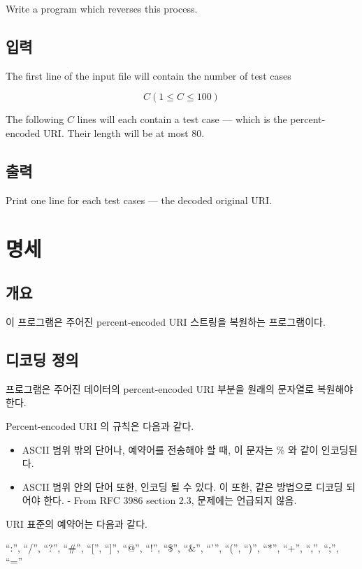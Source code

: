 \documentclass {article}
\begin{document}
Write a program which reverses this process.

\subsection {입력}
The first line of the input file will contain the number of test cases

\begin{equation}
  C (1 \le C \le 100)
\end{equation}

The following $C$ lines will each contain a test case —
which is the percent-encoded URI. Their length will be at most 80.

\subsection {출력}
Print one line for each test cases — the decoded original URI.

\section {명세}
\subsection {개요}
이 프로그램은 주어진 percent-encoded URI 스트링을 복원하는 프로그램이다.

\subsection {디코딩 정의}
프로그램은 주어진 데이터의 percent-encoded URI 부분을 원래의 문자열로 복원해야 한다.

Percent-encoded URI 의 규칙은 다음과 같다.

\begin{itemize}
\item ASCII 범위 밖의 단어나, 예약어를 전송해야 할 때, 이 문자는 \%<8BIT HEX CODE> 와 같이 인코딩된다. %
\item ASCII 범위 안의 단어 또한, 인코딩 될 수 있다. 이 또한, 같은 방법으로 디코딩 되어야 한다. - From RFC 3986 section 2.3, 문제에는 언급되지 않음.
\end{itemize}

URI 표준의 예약어는 다음과 같다.

``:'', ``/'', ``?'', ``\#'', ``['', ``]'', ``@'', ``!'', ``\$'',
``\&'', ``{'}'', ``('', ``)'', ``*'', ``+'', ``,'', ``;'', ``=''
\end{document}
